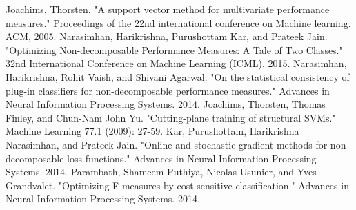 \documentclass{article} %
\begin{document}
\begin{thebibliography}{99}
	
	 Joachims, Thorsten. "A support vector method for multivariate performance measures." Proceedings of the 22nd international conference on Machine learning. ACM, 2005.
	 Narasimhan, Harikrishna, Purushottam Kar, and Prateek Jain. "Optimizing Non-decomposable Performance Measures: A Tale of Two Classes." 32nd International Conference on Machine Learning (ICML). 2015.
	 Narasimhan, Harikrishna, Rohit Vaish, and Shivani Agarwal. "On the statistical consistency of plug-in classifiers for non-decomposable performance measures." Advances in Neural Information Processing Systems. 2014.
	 Joachims, Thorsten, Thomas Finley, and Chun-Nam John Yu. "Cutting-plane training of structural SVMs." Machine Learning 77.1 (2009): 27-59.
	 Kar, Purushottam, Harikrishna Narasimhan, and Prateek Jain. "Online and stochastic gradient methods for non-decomposable loss functions." Advances in Neural Information Processing Systems. 2014.
	 Parambath, Shameem Puthiya, Nicolas Usunier, and Yves Grandvalet. "Optimizing F-measures by cost-sensitive classification." Advances in Neural Information Processing Systems. 2014.
	
\end{thebibliography}
\end{document}
